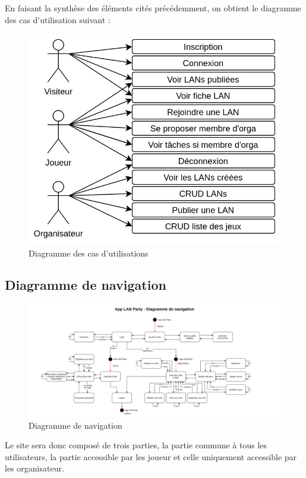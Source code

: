 \documentclass[12pt]{article}
\begin{document}
En faisant la synthèse des éléments cités précédemment, on obtient le diagramme des cas d'utilisation suivant :

\begin{figure}[H]
\centering
\includegraphics[scale=.40]{images/cas_utilisation.jpg}
\caption{Diagramme des cas d'utilisations}
\label{}
\end{figure}

\subsection{Diagramme de navigation}
\begin{figure}[H]
\centering
\includegraphics[scale=0.21,angle=90,origin=c]{images/navigation.jpg}
\caption{Diagramme de navigation}
\label{}
\end{figure}


Le site sera donc composé de trois parties, la partie commune à tous les utilisateurs, la partie accessible par les joueur et celle uniquement accessible par les organisateur.
\newline
\end{document}
